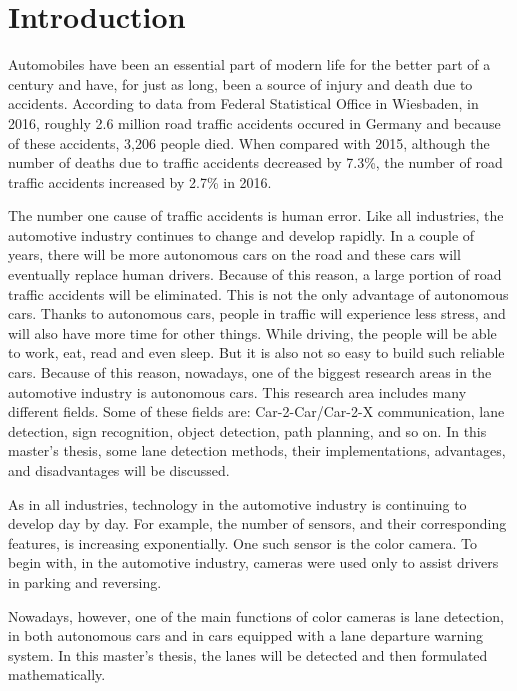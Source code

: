 
\chapter{Introduction}\label{cha:Intro}

Automobiles have been an essential part of modern life for the better part of a century and have, for just as long, been a source of injury and death due to accidents. According to data from  Federal Statistical Office in Wiesbaden, in 2016, roughly 2.6 million road traffic accidents occured in Germany and because of these accidents, 3,206 people died. When compared with 2015, although the number of deaths due to traffic accidents decreased by 7.3\%, the number of road traffic accidents increased by 2.7\% in 2016.\cite{Statis}

The number one cause of traffic accidents is human error. Like all industries, the automotive industry continues to change and develop rapidly. In a couple of years, there will be more autonomous cars on the road and these cars will eventually replace human drivers. Because of this reason, a large portion of road traffic accidents will be eliminated. This is not the only advantage of autonomous cars. Thanks to autonomous cars, people in traffic will experience less stress, and will also have more time for other things. While driving, the people will be able to work, eat, read and even sleep. But it is also not so easy to build such reliable cars. Because of this reason, nowadays, one of the biggest research areas in the automotive industry is autonomous cars. This research area includes many different fields. Some of these fields are: Car-2-Car/Car-2-X communication, lane detection, sign recognition, object detection, path planning, and so on. In this master's thesis, some lane detection methods, their implementations, advantages, and disadvantages will be discussed.

As in all industries, technology in the automotive industry is continuing to develop day by day. For example, the number of sensors, and their corresponding features, is increasing exponentially. One such sensor is the color camera. To begin with, in the automotive industry, cameras were used only to assist drivers in parking and reversing.
 
Nowadays, however, one of the main functions of color cameras is lane detection, in both autonomous cars and in cars equipped with a lane departure warning system. In this master's thesis, the lanes will be detected and then formulated mathematically.

